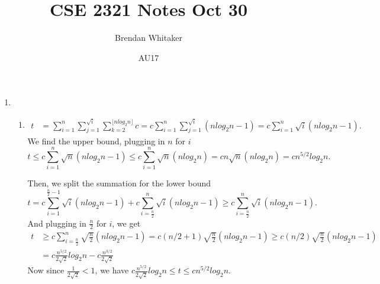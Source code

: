 \documentclass[10pt,oneside,reqno]{amsart}
\theoremstyle{plain}
\theoremstyle{definition}
\begin{document}
\title{CSE 2321 Notes Oct 30}

\date{AU17}

\author[Brendan Whitaker]{Brendan Whitaker}

\maketitle

\begin{enumerate}[label=2.]

\item 

\begin{enumerate}

\item 

\begin{equation}
\begin{aligned}
t &= \sum_{i = 1}^n \sum_{j = 1}^{\sqrt{i}} \sum_{k = 2}^{\lfloor nlog_2n \rfloor}c = c\sum_{i = 1}^n \sum_{j = 1}^{\sqrt{i}} (nlog_2n - 1) = c\sum_{i = 1}^n \sqrt{i}(nlog_2n - 1). 
\end{aligned}
\end{equation}
We find the upper bound, plugging in $n$ for $i$
\[t \leq c\sum_{i = 1}^n \sqrt{n}(nlog_2n - 1) \leq c\sum_{i = 1}^n \sqrt{n}(nlog_2n) = cn\sqrt{n}(nlog_2n) = \boxed{cn^{5/2}log_2n}. \]

Then, we split the summation for the lower bound
\[t = c\sum_{i = 1}^{\frac{n}{2} - 1} \sqrt{i}(nlog_2n - 1) + c\sum_{i = \frac{n}{2}}^n \sqrt{i}(nlog_2n - 1) \geq c\sum_{i = \frac{n}{2}}^n \sqrt{i}(nlog_2n - 1). \]
And plugging in $\frac{n}{2}$ for $i$, we get
\begin{equation}
\begin{aligned}
t &\geq c\sum_{i = \frac{n}{2}}^n \sqrt{\frac{n}{2}}(nlog_2n - 1) = c(n/2 + 1)\sqrt{\frac{n}{2}}(nlog_2n - 1) \geq c(n/2)\sqrt{\frac{n}{2}}(nlog_2n - 1)\\
& = \boxed{c\frac{n^{5/2}}{2\sqrt{2}}log_2n} - c\frac{n^{3/2}}{2\sqrt{2}}
\end{aligned}
\end{equation}
Now since $\frac{1}{2\sqrt{2}} < 1$, we have $c\frac{n^{5/2}}{2\sqrt{2}}log_2n \leq t \leq cn^{5/2}log_2n$. 
\end{enumerate}

\end{enumerate}
\end{document}
